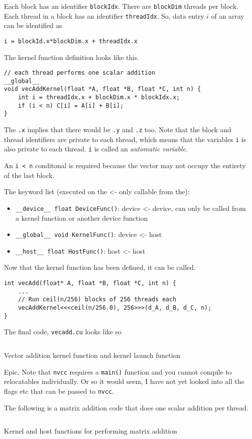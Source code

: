 Each block has an identifier \texttt{blockIdx}. There are
\texttt{blockDim} threads per block. Each thread in a block has
an identifier \texttt{threadIdx}. So, data entry $i$ of an array
can be identified as
\begin{verbatim}
i = blockId.x*blockDim.x + threadIdx.x 
\end{verbatim}

The kernel function definition looks like this.
\begin{verbatim}
// each thread performs one scalar addition
__global__
void vecAddKernel(float *A, float *B, float *C, int n) {
    int i = threadIdx.x + blockDim.x * blockIdx.x;
    if (i < n) C[i] = A[i] + B[i];
}
\end{verbatim}
The \texttt{.x} implies that there would be \texttt{.y} and 
\texttt{.z} too. Note that the block and thread identifiers are
private to each thread, which means that the variables \texttt{i}
is also private to each thread. \texttt{i} is called an \textit{
    automatic variable}.

An \texttt{i < n} conditonal is required because the vector may not
occupy the entirety of the last block.

The keyword list (executed on the <- only callable from the):
\begin{itemize}
    \item \texttt{\_\_device\_\_ float DeviceFunc()}: device <- device, can only be called from a kernel function or another device function
    \item \texttt{\_\_global\_\_ void KernelFunc()}: device <- host
    \item \texttt{\_\_host\_\_ float HostFunc()}: host <- host
\end{itemize}

Now that the kernel function has been defined, it can be called.
\begin{verbatim}
int vecAdd(float* A, float *B, float *C, int n) {
    ...
    // Run ceil(n/256) blocks of 256 threads each
    vecAddKernel<<<ceil(n/256.0), 256>>>(d_A, d_B, d_C, n);
}
\end{verbatim}

The final code, \texttt{vecadd.cu} looks like so
\begin{code}
\inputminted[samepage=false, breaklines, linenos]{c}{../codes/vecAdd/vecadd.cu}
\label{lst:vecaddfinal}
\caption{Vector addition kernel function and kernel launch function}
\end{code}

Epic. Note that \texttt{nvcc} requires a \texttt{main()} function
and you cannot compile to relocatables individually. Or so it would
seem, I have not yet looked into all the flags etc that can be
passed to \texttt{nvcc}.

The following is a matrix addition code that does one scalar addition
per thread.

\begin{code}
\inputminted[samepage=false, breaklines, linenos]{c}{../codes/matrixAdd/matrixAdd.cu}
\label{lst:matadd1}
\caption{Kernel and host functions for performing matrix addition}
\end{code}      

